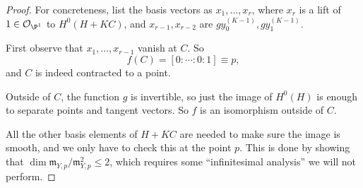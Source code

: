\documentclass[a4paper]{article}
\begin{document}
\begin{proof}
  For concreteness, list the basis vectors as $x_1, \ldots, x_r$, where $x_r$ is a lift of $1 \in \mathcal{O}_{\P^1}$ to $H^0(H + KC)$, and $x_{r - 1}, x_{r - 2}$ are $g y_0^{(K - 1)}, gy_1^{(K - 1)}$.

  First observe that $x_1, \ldots, x_{r - 1}$ vanish at $C$. So
  \[
    f(C) = [0:\cdots:0:1] \equiv p,
  \]
  and $C$ is indeed contracted to a point.

  Outside of $C$, the function $g$ is invertible, so just the image of $H^0(H)$ is enough to separate points and tangent vectors. So $f$ is an isomorphism outside of $C$.

  All the other basis elements of $H + KC$ are needed to make sure the image is smooth, and we only have to check this at the point $p$. This is done by showing that $\dim \mathfrak{m}_{Y, p}/\mathfrak{m}_{Y, p}^2 \leq 2$, which requires some ``infinitesimal analysis'' we will not perform.
%
%

\end{proof}
\end{document}
